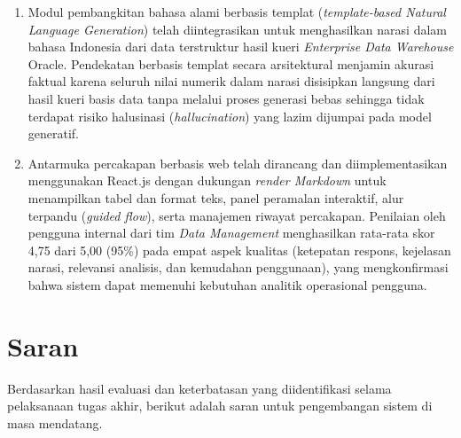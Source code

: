\begin{enumerate}
  \item Modul pembangkitan bahasa alami berbasis templat (\textit{template-based Natural Language Generation}) telah diintegrasikan untuk menghasilkan narasi dalam bahasa Indonesia dari data terstruktur hasil kueri \textit{Enterprise Data Warehouse} Oracle. Pendekatan berbasis templat secara arsitektural menjamin akurasi faktual karena seluruh nilai numerik dalam narasi disisipkan langsung dari hasil kueri basis data tanpa melalui proses generasi bebas sehingga tidak terdapat risiko halusinasi (\textit{hallucination}) yang lazim dijumpai pada model generatif.

  \item Antarmuka percakapan berbasis web telah dirancang dan diimplementasikan menggunakan React.js dengan dukungan \textit{render Markdown} untuk menampilkan tabel dan format teks, panel peramalan interaktif, alur terpandu (\textit{guided flow}), serta manajemen riwayat percakapan. Penilaian oleh pengguna internal dari tim \textit{Data Management} menghasilkan rata-rata skor 4{,}75 dari 5{,}00 (95\%) pada empat aspek kualitas (ketepatan respons, kejelasan narasi, relevansi analisis, dan kemudahan penggunaan), yang mengkonfirmasi bahwa sistem dapat memenuhi kebutuhan analitik operasional pengguna.
\end{enumerate}

\section{Saran}

Berdasarkan hasil evaluasi dan keterbatasan yang diidentifikasi selama pelaksanaan tugas akhir, berikut adalah saran untuk pengembangan sistem di masa mendatang.

